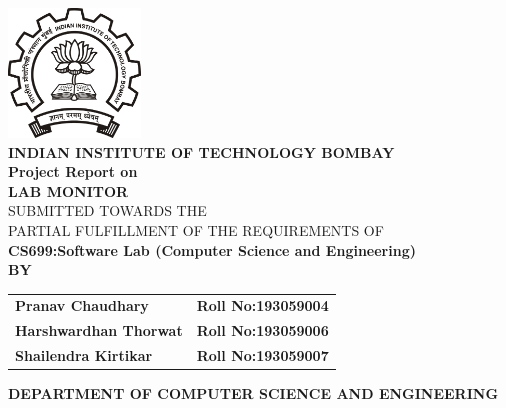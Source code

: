 \documentclass[oneside,a4paper,12pt]{article}
\begin{document}
\setlength{\parindent}{0mm}
\begin{center}
\includegraphics[width=100pt]{assets/iitb_logo.png} \\
\vspace{20pt}
{\bfseries INDIAN INSTITUTE OF TECHNOLOGY BOMBAY \\}
 \vspace*{2\baselineskip}
{\bfseries Project Report on \\}
 \vspace*{1\baselineskip}
{\bfseries \fontsize{16}{12} \selectfont  LAB MONITOR \\ \vspace*{2\baselineskip}}
{\fontsize{12}{12} \selectfont SUBMITTED TOWARDS THE
 \\PARTIAL FULFILLMENT OF THE REQUIREMENTS OF \\

\vspace*{2\baselineskip}}
{\bfseries \fontsize{14}{12} \selectfont CS699:Software Lab (Computer Science and
Engineering) \\
\vspace*{1\baselineskip}} 
{\bfseries \fontsize{14}{12} \selectfont BY \\ 
\vspace*{1\baselineskip}} 

\begin{tabular}{l l}
\bfseries{Pranav Chaudhary}     &  \hspace{10mm}\bfseries{Roll No:193059004}\\
\bfseries{Harshwardhan Thorwat}     &  \hspace{10mm}\bfseries{Roll No:193059006}\\
\bfseries{Shailendra Kirtikar}     &  \hspace{10mm}\bfseries{Roll No:193059007}\\

\end{tabular}

\vspace*{2\baselineskip}
\vspace{20pt}

{\bfseries \fontsize{14}{12} \selectfont DEPARTMENT OF COMPUTER SCIENCE AND ENGINEERING \\
\vspace{20pt}}

\end{center}
\end{document}
